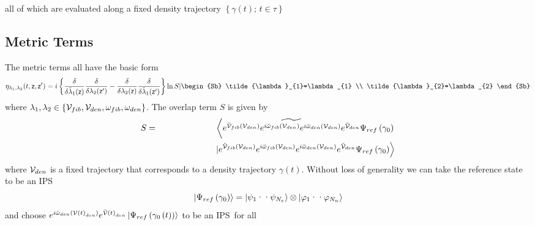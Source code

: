 all of which are evaluated along a fixed density trajectory $\left\{ \gamma
\left( t\right) ;\,t\in \tau \right\} $

\subsection{\protect\bigskip Metric Terms}

The metric terms all have the basic form 
\begin{equation}
\eta _{\lambda _{1},\lambda _{2}}(t,{\sf z},{\sf z}^{\prime })=i\left\{ 
\frac{\delta }{\delta \tilde{\lambda}_{1}({\sf z})}\frac{\delta }{\delta
\lambda _{2}({\sf z}^{\prime })}-\frac{\delta }{\delta \lambda _{2}({\sf z})}%
\frac{\delta }{\delta \tilde{\lambda}_{1}({\sf z}^{\prime })}\right\} \ln S| 
\begin{Sb} \tilde{\lambda}_{1}=\lambda _{1}  \\ \tilde{\lambda}_{2}=\lambda
_{2}  \end{Sb}   \label{metric}
\end{equation}%
where $\lambda _{1},\lambda _{2}\in \left\{ {\cal V}_{fib},{\cal V}%
_{den},\omega _{fib},\omega _{den}\right\} $. The overlap term $S$ is given
by 
\begin{eqnarray}
S &=&\left\langle \widetilde{e^{{\cal \breve{V}}_{fib}({\cal V}_{den})}e^{i%
{\cal \breve{\omega}}_{fib}({\cal V}_{den})}e^{i{\cal \breve{\omega}}_{den}(%
{\cal V}_{den})}e^{{\cal \breve{V}}_{den}}}\Psi _{ref}\left( \gamma
_{0}\right) \right.  \nonumber \\
&&\qquad \qquad \qquad \left. |e^{{\cal \breve{V}}_{fib}({\cal V}_{den})}e^{i%
{\cal \breve{\omega}}_{fib}({\cal V}_{den})}e^{i{\cal \breve{\omega}}_{den}(%
{\cal V}_{den})}e^{{\cal \breve{V}}_{den}}\Psi _{ref}\left( \gamma
_{0}\right) \right\rangle
\end{eqnarray}%
where ${\cal V}_{den}$ is a fixed trajectory that corresponds to a density
trajectory $\gamma \left( t\right) $. Without loss of generality we can take
the reference state to be an IPS 
\begin{equation}
\left| \Psi _{ref}\left( \gamma _{0}\right) \right\rangle =\left| \psi _{1}%
\text{\textperiodcentered \textperiodcentered }\psi _{N_{e}}\right\rangle
\otimes \left| \varphi _{1}\text{\textperiodcentered \textperiodcentered }%
\varphi _{N_{n}}\right\rangle
\end{equation}%
and choose $e^{i{\cal \breve{\omega}}_{den}({\cal V}\left( t\right)
_{den})}e^{{\cal \breve{V}}\left( t\right) _{den}}\left| \Psi _{ref}\left(
\gamma _{0}\left( t\right) \right) \right\rangle $ to be an IPS\ for all

